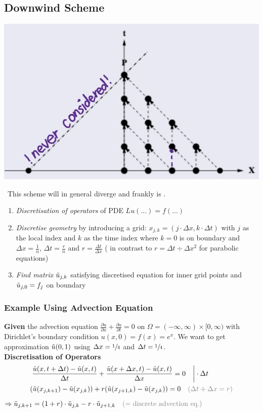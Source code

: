 \subsection{Downwind Scheme}

\includegraphics[width=0.3\columnwidth]{images/downwind_scheme}

{\color{orange}\faWarning\ This scheme will in general diverge and frankly is \faTrash.}

\begin{enumerate}
	\item \emph{Discretisation of operators} of PDE $Lu(...)=f(...)$
	\item{
		\emph{Discretise geometry} by introducing a grid:
		$x_{j,k} = (j\cdot\Delta x, k\cdot\Delta t)$ with $j$ as the local index
		and $k$ as the time index where $k=0$ is on boundary
		and \colorbox{shadecolor}{$\Delta x = \frac{1}{n}$},
		\colorbox{shadecolor}{$\Delta t = \frac{r}{n}$}
		and \colorbox{shadecolor}{$r = \frac{\Delta t}{\Delta x}$} 
		({\color{orange}\faWarning} in contrast to $r=\Delta t\div\Delta x^2$ for parabolic equations)
	}
	\item{
		\emph{Find matrix $\tilde{u}_{j,k}$} satisfying discretised equation for inner grid points
		and $\tilde{u}_{j,0}=f_j$ on boundary
	}
\end{enumerate}

\subsubsection{Example Using Advection Equation}

\textbf{Given} the advection equation 
$\frac{\partial u}{\partial x} + \frac{\partial u}{\partial t} = 0$ on
$\Omega = (-\infty,\infty)\times[0,\infty)$ with Dirichlet's boundary condition
$u(x,0) = f(x) = e^x$. We want to get approximation $\tilde{u}(0,1)$ using
$\Delta x = \sfrac{1}{4}$ and $\Delta t = \sfrac{1}{4}$.
\\[1em]
\textbf{Discretisation of Operators}
\begin{align*}
	& \left.{\frac{\utild(x,t+\Delta t)-\utild(x,t)}{\Delta t}}
	+ {\frac{\utild(x+\Delta x,t)-\utild(x,t)}{\Delta x}} = 0\quad\right|\cdot \Delta t \\
	& (\utild(x_{j,k+1})-\utild(x_{j,k}))+r(\utild(x_{j+1,k})-\utild(x_{j,k}))=0
	{\color{gray} \quad(\Delta t\div\Delta x = r)}
\end{align*}
\colorbox{shadecolor}{$
	\displaystyle
	\Rightarrow \utild_{j,k+1}
	= \left(1+r\right)\cdot\utild_{j,k}-r\cdot\utild_{j+1,k}
	{\color{gray}\quad\text{(= discrete advection eq.)}}
$}

